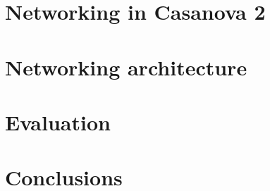 \documentclass[preprint,12pt]{elsarticle}
\begin{document}
\section{Networking in Casanova 2}
\label{sec:networking}



\section{Networking architecture}
\label{sec:net_architecture}


\section{Evaluation}
\label{sec:evaluation}


\section{Conclusions}
\label{sec:conclusions_and_future_works}







\end{document}
